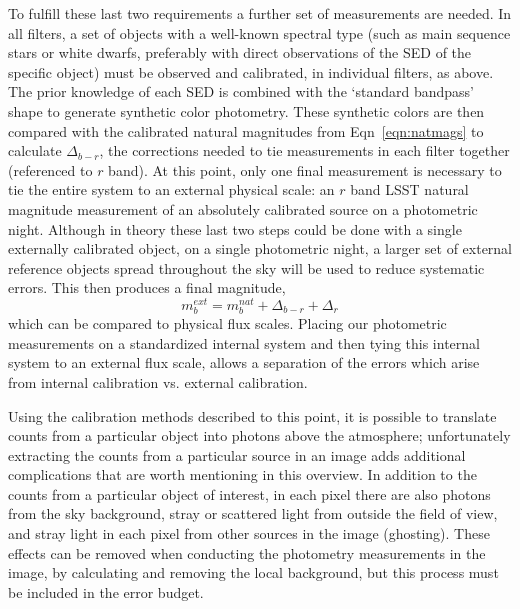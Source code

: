 \documentclass[12pt,preprint]{aastex}
\begin{document}
To fulfill these last two requirements a further set of measurements
are needed. In all filters, a set of objects with a well-known
spectral type (such as main sequence stars or white dwarfs, preferably
with direct observations of the SED of the specific object) must be
observed and calibrated, in individual filters, as above. The prior
knowledge of each SED is combined with the `standard bandpass' shape
to generate synthetic color photometry. These synthetic colors are
then compared with the calibrated natural magnitudes from
Eqn~\ref{eqn:natmags} to calculate $\Delta_{b-r}$, the corrections
needed to tie measurements in each filter together (referenced to $r$
band).  At this point, only one final measurement is necessary to tie
the entire system to an external physical scale: an $r$ band LSST
natural magnitude measurement of an absolutely calibrated source on a
photometric night. Although in theory these last two steps could be
done with a single externally calibrated object, on a single
photometric night, a larger set of external reference objects spread
throughout the sky will be used to reduce systematic errors. This then
produces a final magnitude, 
\begin{equation}
\label{eqn:finalmags}
m_b^{ext} = m_b^{nat}  + \Delta_{b-r} + \Delta_r
\end{equation}
which can be compared to physical flux scales. Placing our photometric
measurements on a standardized internal system and then tying this
internal system to an external flux scale, allows a separation
of the errors which arise from internal calibration vs. external
calibration. 

Using the calibration methods described to this point, it is possible
to translate counts from a particular object into photons above the
atmosphere; unfortunately extracting the counts from a particular
source in an image adds additional complications that are worth
mentioning in this overview. In addition to the counts from a
particular object of interest, in each pixel there are also photons
from the sky background, stray or scattered light from outside the
field of view, and stray light in each pixel from other sources
in the image (ghosting). These effects can be removed when conducting
the photometry measurements in the image, by calculating and removing
the local background, but this process must be included in the error
budget.
\end{document}
